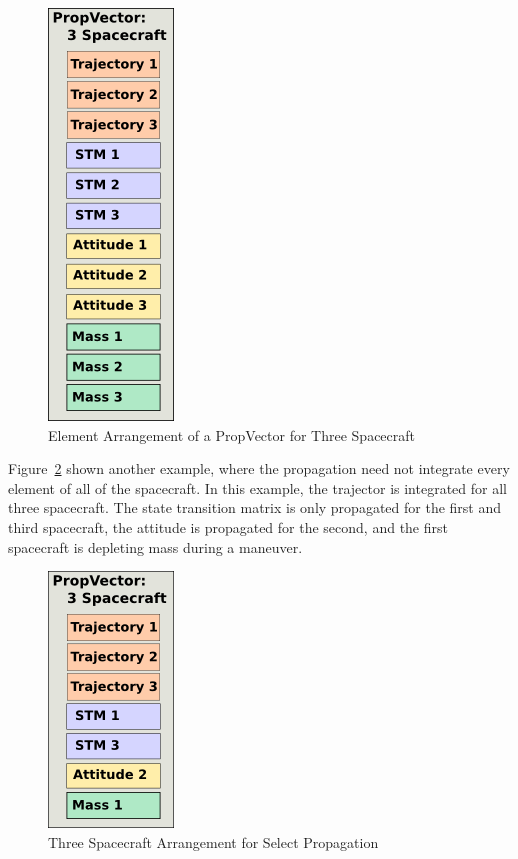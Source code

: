 \begin{figure}[htb]
\begin{center}
\includegraphics[63,207]{Images/ThreeSatPropVector.png}
\caption{\label{figure:ThreeSatPropVector}Element Arrangement of a PropVector for Three
Spacecraft}
\end{center}
\end{figure}

Figure~\ref{figure:SelectPropVector} shown another example, where the propagation need not
integrate every element of all of the spacecraft.  In this example, the trajector is integrated for
all three spacecraft.  The state transition matrix is only propagated for the first and third
spacecraft, the attitude is propagated for the second, and the first spacecraft is depleting mass
during a maneuver.

\begin{figure}[htb]
\begin{center}
\includegraphics[63,129]{Images/ThreeSatActivePropVector.png}
\caption{\label{figure:SelectPropVector}Three Spacecraft Arrangement for Select
Propagation}
\end{center}
\end{figure}

